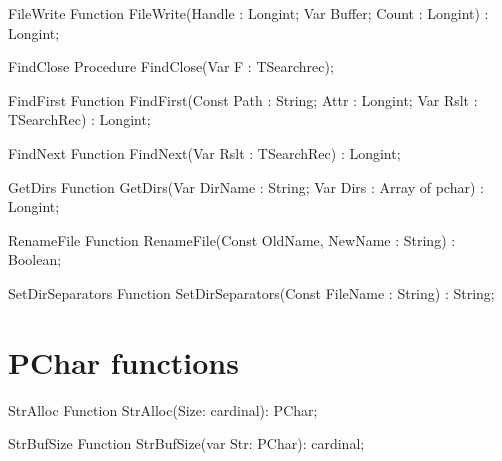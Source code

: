  
\begin{function}{FileWrite}
\Declaration
Function FileWrite(Handle : Longint; Var Buffer; Count : Longint) : Longint;
\Description
\Errors
\SeeAlso
\end{function}

 
\begin{procedure}{FindClose}
\Declaration
Procedure FindClose(Var F : TSearchrec);
\Description
\Errors
\SeeAlso
\end{procedure}

 
\begin{function}{FindFirst}
\Declaration
Function FindFirst(Const Path : String; Attr : Longint; Var Rslt : TSearchRec) : Longint;
\Description
\Errors
\SeeAlso
\end{function}

 
\begin{function}{FindNext}
\Declaration
Function FindNext(Var Rslt : TSearchRec) : Longint;
\Description
\Errors
\SeeAlso
\end{function}

 
\begin{function}{GetDirs}
\Declaration
Function GetDirs(Var DirName : String; Var Dirs : Array of pchar) : Longint; 
\Description
\Errors
\SeeAlso
\end{function}

 
\begin{function}{RenameFile}
\Declaration
Function RenameFile(Const OldName, NewName : String) : Boolean;
\Description
\Errors
\SeeAlso
\end{function}

 
\begin{function}{SetDirSeparators}
\Declaration
Function SetDirSeparators(Const FileName : String) : String;
\Description
\Errors
\SeeAlso
\end{function}

 

\section{PChar functions}

\begin{function}{StrAlloc}
\Declaration
Function StrAlloc(Size: cardinal): PChar;
\Description
\Errors
\SeeAlso
\end{function}

 
\begin{function}{StrBufSize}
\Declaration
Function StrBufSize(var Str: PChar): cardinal;
\Description
\Errors
\SeeAlso
\end{function}

